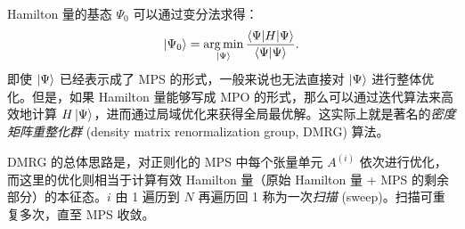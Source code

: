 Hamilton 量的基态 $\Psi_0$ 可以通过变分法求得：
\begin{equation}
  \ket{\Psi_0} = \argmin_{\ket{\Psi}} \frac{\langle\Psi|H|\Psi\rangle}{\langle\Psi|\Psi\rangle}.
\end{equation}
即使 $\ket{\Psi}$ 已经表示成了 MPS 的形式，一般来说也无法直接对 $\ket{\Psi}$ 进行整体优化。但是，如果 Hamilton 量能够写成 MPO 的形式，那么可以通过迭代算法来高效地计算 $H\ket{\Psi}$，进而通过局域优化来获得全局最优解。这实际上就是著名的\emph{密度矩阵重整化群} (density matrix renormalization group, DMRG) 算法\cite{white1992density,white1993density,schollwock2005density,mcculloch2007density,mcculloch2008infinite,schollwock2011density}。

DMRG 的总体思路是，对正则化的 MPS 中每个张量单元 $A^{(i)}$ 依次进行优化，而这里的优化则相当于计算有效 Hamilton 量（原始 Hamilton 量 + MPS 的剩余部分）的本征态。$i$ 由 1 遍历到 $N$ 再遍历回 1 称为一次\emph{扫描} (sweep)。扫描可重复多次，直至 MPS 收敛。

